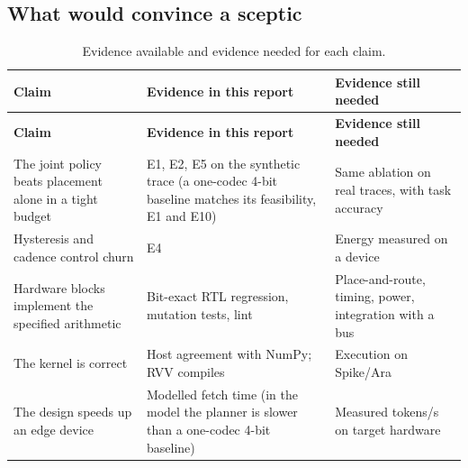 \documentclass[12pt,a4paper]{report}
\begin{document}
\subsection{What would convince a sceptic}\label{sec:13_4}
{\fontsize{8}{9.5}\selectfont\setlength{\tabcolsep}{3pt}
\begin{longtable}{>{\raggedright\arraybackslash}p{1.99in}>{\raggedright\arraybackslash}p{1.99in}>{\raggedright\arraybackslash}p{1.99in}}
\caption{Evidence available and evidence needed for each claim.}\\
\toprule
\textbf{Claim} & \textbf{Evidence in this report} & \textbf{Evidence still needed} \\\midrule\endfirsthead
\toprule \textbf{Claim} & \textbf{Evidence in this report} & \textbf{Evidence still needed} \\\midrule\endhead
\bottomrule\endfoot
The joint policy beats placement alone in a tight budget & E1, E2, E5 on the synthetic trace (a one-codec 4-bit baseline matches its feasibility, E1 and E10) & Same ablation on real traces, with task accuracy \\
Hysteresis and cadence control churn & E4 & Energy measured on a device \\
Hardware blocks implement the specified arithmetic & Bit-exact RTL regression, mutation tests, lint & Place-and-route, timing, power, integration with a bus \\
The kernel is correct & Host agreement with NumPy; RVV compiles & Execution on Spike/Ara \\
The design speeds up an edge device & Modelled fetch time (in the model the planner is slower than a one-codec 4-bit baseline) & Measured tokens/s on target hardware \\
\bottomrule
\end{longtable}}
\end{document}
